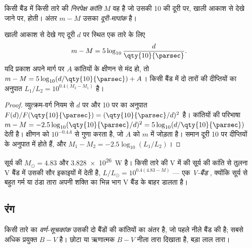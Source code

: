 \begin{definition}[निरपेक्ष कांति, दूरी-मापांक]\label{def:b1:observing-the-sky:absolute}
किसी बैंड में किसी तारे की \emph{निरपेक्ष कांति} $M$ वह  है जो उसकी
\qty{10}{\parsec} की दूरी पर, खाली आकाश से देखे जाने पर, होती। अंतर $m - M$ उसका \emph{दूरी-मापांक}
है।
\end{definition}

\begin{proposition}[दूरी-मापांक]\label{prop:b1:observing-the-sky:modulus}
खाली आकाश से देखे गए दूरी $d$ पर स्थित एक तारे के लिए
\[
  m - M = 5\log_{10}\frac{d}{\qty{10}{\parsec}} .
\]
यदि प्रकाश अपने मार्ग पर $A$ कांतियों के क्षीणन से मंद हो, तो
$m - M = 5\log_{10}(d/\qty{10}{\parsec}) + A$। किसी बैंड में दो तारों की दीप्तियों का अनुपात
$L_1/L_2 = 10^{0.4(M_2 - M_1)}$ है।
\end{proposition}

\begin{proof}
व्युत्क्रम-वर्ग नियम से $d$ पर  और \qty{10}{\parsec} पर  का अनुपात
$F(d)/F(\qty{10}{\parsec}) = (\qty{10}{\parsec}/d)^2$ है। कांतियों की परिभाषा $m - M = -2.5\log_{10}(\qty{10}{\parsec}/d)^2
= 5\log_{10}(d/\qty{10}{\parsec})$ देती है। क्षीणन  को $10^{-0.4A}$ से गुणा करता है, जो $A$ को $m$ में जोड़ता है।
समान दूरी \qty{10}{\parsec} पर  दीप्तियों के अनुपात में होते हैं, और $M_1 - M_2 = -2.5\log_{10}(L_1/L_2)$।
\end{proof}

सूर्य की  $M_\odot = 4.83$ और  \qty{3.828e26}{W} है। किसी तारे की V में  की
सूर्य की कांति से तुलना V बैंड में उसकी  सौर इकाइयों में देती है,
$L/L_\odot = 10^{0.4(4.83 - M)}$ --- एक \emph{V-बैंड} , क्योंकि सूर्य से बहुत गर्म या ठंडा तारा अपनी
शक्ति का भिन्न भाग V बैंड के बाहर डालता है।

\subsection*{रंग}

\begin{definition}[वर्ण-सूचकांक]\label{def:b1:observing-the-sky:colour-index}
किसी तारे का \emph{वर्ण-सूचकांक} उसकी दो बैंडों की कांतियों का अंतर है, जो पहले
नीले बैंड की है; सबसे अधिक प्रयुक्त $B - V$ है। छोटा या ऋणात्मक $B - V$ नीला तारा दिखाता है, बड़ा
लाल तारा।
\end{definition}

